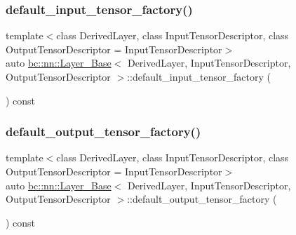 \mbox{\label{structbc_1_1nn_1_1Layer__Base_a93722bcd7c45ba6957645585fabab1f0}} 
\subsubsection{\texorpdfstring{default\+\_\+input\+\_\+tensor\+\_\+factory()}{default\_input\_tensor\_factory()}}
{\footnotesize\ttfamily template$<$class Derived\+Layer, class Input\+Tensor\+Descriptor, class Output\+Tensor\+Descriptor = Input\+Tensor\+Descriptor$>$ \\
auto \hyperlink{structbc_1_1nn_1_1Layer__Base}{bc\+::nn\+::\+Layer\+\_\+\+Base}$<$ Derived\+Layer, Input\+Tensor\+Descriptor, Output\+Tensor\+Descriptor $>$\+::default\+\_\+input\+\_\+tensor\+\_\+factory (\begin{DoxyParamCaption}{ }\end{DoxyParamCaption}) const\hspace{0.3cm}{\ttfamily [inline]}}

\mbox{\label{structbc_1_1nn_1_1Layer__Base_ad68e49c1f7a7b81c0ba5ac3537126414}} 
\subsubsection{\texorpdfstring{default\+\_\+output\+\_\+tensor\+\_\+factory()}{default\_output\_tensor\_factory()}}
{\footnotesize\ttfamily template$<$class Derived\+Layer, class Input\+Tensor\+Descriptor, class Output\+Tensor\+Descriptor = Input\+Tensor\+Descriptor$>$ \\
auto \hyperlink{structbc_1_1nn_1_1Layer__Base}{bc\+::nn\+::\+Layer\+\_\+\+Base}$<$ Derived\+Layer, Input\+Tensor\+Descriptor, Output\+Tensor\+Descriptor $>$\+::default\+\_\+output\+\_\+tensor\+\_\+factory (\begin{DoxyParamCaption}{ }\end{DoxyParamCaption}) const\hspace{0.3cm}{\ttfamily [inline]}}


